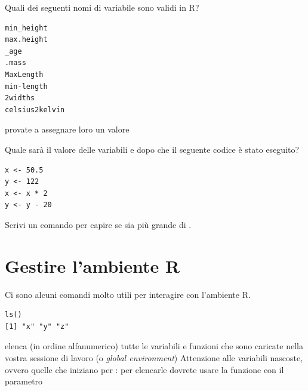 \begin{exercise}\label{ex2.1}

\noindent
Quali dei seguenti nomi di variabile sono validi in R?

\begin{lstlisting}[style=Rstyle]
min_height
max.height
_age
.mass
MaxLength
min-length
2widths
celsius2kelvin
\end{lstlisting}

	\begin{myitemize}
		\item provate a assegnare loro un valore 
	\end{myitemize}
\end{exercise}


\vspace{0.5cm} 

\begin{exercise}\label{ex2.2}

\noindent
Quale sar\`a il valore delle variabili  e  dopo che il seguente codice \`e stato eseguito?

\begin{lstlisting}[style=Rstyle]
x <- 50.5
y <- 122
x <- x * 2
y <- y - 20
\end{lstlisting}
	
\end{exercise}	


\vspace{0.5cm} 

\begin{exercise}\label{ex2.3}

\noindent
Scrivi un comando per capire se  sia pi\`u grande di .

\end{exercise}	


\section{Gestire l'ambiente R}
\label{sec:environment}

Ci sono alcuni comandi molto utili per interagire con l'ambiente R.

\begin{lstlisting}[style=Rstyle]
ls()
[1] "x" "y" "z"
\end{lstlisting}
%
elenca (in ordine alfanumerico) tutte le variabili e funzioni che sono caricate nella vostra sessione di lavoro (o \emph{global environment})
%
Attenzione alle variabili nascoste, ovvero quelle che iniziano per : per elencarle dovrete usare la funzione  con il parametro 


